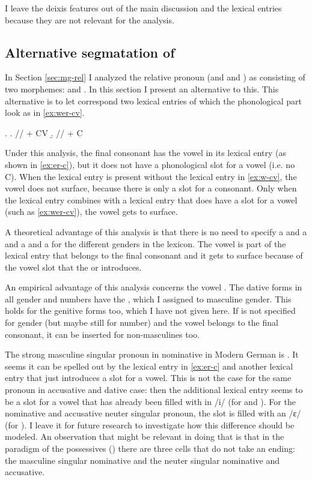 I leave the deixis features out of the main discussion and the lexical entries because they are not relevant for the analysis.

\subsection{Alternative segmatation of }\label{sec:mg-w-er-cv}

In Section \ref{sec:mg-rel} I analyzed the relative pronoun  (and  and ) as consisting of two morphemes:  and . In this section I present an alternative to this. This alternative is to let  correspond two lexical entries of which the phonological part look as in \ref{ex:wer-cv}.

\ex.\label{ex:wer-cv}
\a.\label{ex:w-cv} // + CV
\b.\label{ex:er-c} // + C

Under this analysis, the final consonant has the vowel  in its lexical entry (as shown in \ref{ex:er-c}), but it does not have a phonological slot for a vowel (i.e. no C). When the lexical entry is present without the lexical entry in \ref{ex:w-cv}, the vowel  does not surface, because there is only a slot for a consonant. Only when the lexical entry combines with a lexical entry that does have a slot for a vowel (such as \ref{ex:wer-cv}), the vowel  gets to surface.

A theoretical advantage of this analysis is that there is no need to specify a  and a  and a  and a  for the different genders in the lexicon. The vowel is part of the lexical entry that belongs to the final consonant and it gets to surface because of the vowel slot that the  or  introduces.

An empirical advantage of this analysis concerns the vowel . The dative forms in all gender and numbers have the , which I assigned to masculine gender. This holds for the genitive forms too, which I have not given here. If  is not specified for gender (but maybe still for number) and the vowel belongs to the final consonant, it can be inserted for non-masculines too.

The strong masculine singular pronoun in nominative in Modern German is . It seems it can be spelled out by the lexical entry in \ref{ex:er-c} and another lexical entry that just introduces a slot for a vowel. This is not the case for the same pronoun in accusative and dative case: then the additional lexical entry seems to be a slot for a vowel that has already been filled with in /i/ (for  and ). For the nominative and accusative neuter singular pronoun, the slot is filled with an /ɛ/ (for ). I leave it for future research to investigate how this difference should be modeled. An observation that might be relevant in doing that is that in the paradigm of the possessives () there are three cells that do not take an ending: the masculine singular nominative and the neuter singular nominative and accusative.

